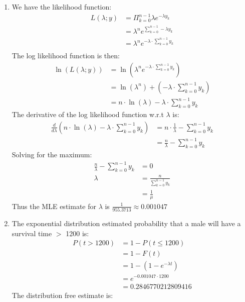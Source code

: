 \documentclass{article}
\begin{document}
\begin{enumerate}
\begin{enumerate}[label=\alph*)]
\begin{figure}[htbp]
\end{figure}
\item We have the likelihood function: \\
\begin{align*}
L(\lambda;y) &= \Pi_{k = 0}^{n-1}\lambda e^{-\lambda y_k} \\
&= \lambda^ne^{\sum_{k=0}^{n-1}-\lambda y_k} \\
&= \lambda^ne^{-\lambda \cdot \sum_{k=0}^{n-1} y_k} \\
\end{align*}
The log likelihood function is then: \\
\begin{align*}
\ln(L(\lambda;y)) &= \ln(\lambda^ne^{-\lambda \cdot \sum_{k=0}^{n-1} y_k}) \\
&= \ln(\lambda^n) + (-\lambda \cdot \sum_{k=0}^{n-1} y_k) \\
&= n \cdot \ln(\lambda) -\lambda \cdot \sum_{k=0}^{n-1} y_k
\end{align*}
The derivative of the log likelihood function w.r.t $\lambda$ is: \\
\begin{align*}
\frac{d}{d\lambda} (n \cdot \ln(\lambda) -\lambda \cdot \sum_{k=0}^{n-1} y_k) &= n \cdot \frac{1}{\lambda} - \sum_{k=0}^{n-1} y_k \\
&= \frac{n}{\lambda} - \sum_{k=0}^{n-1} y_k
\end{align*}
Solving for the maximum: \\
\begin{align*}
\frac{n}{\lambda} - \sum_{k=0}^{n-1} y_k &= 0 \\
\lambda &= \frac{n}{\sum_{k=0}^{n-1} y_k} \\
&= \frac{1}{\mu}
\end{align*}
Thus the MLE estimate for $\lambda$ is $\frac{1}{955.3713} \approx 0.001047$
\item The exponential distribution estimated probability that a male will have a survival time $>$ 1200 is: \\
\begin{align*}
P(t > 1200) &= 1 - P(t \leq 1200) \\
&= 1 - F(t) \\
&= 1 - (1 - e^{-\lambda t}) \\
&= e^{-0.001047 \cdot 1200}\\ 
&= 0.2846770212809416
\end{align*}
The distribution free estimate is: \\
\begin{align*}

\end{align*}
\end{enumerate}
\end{enumerate}
\end{document}

